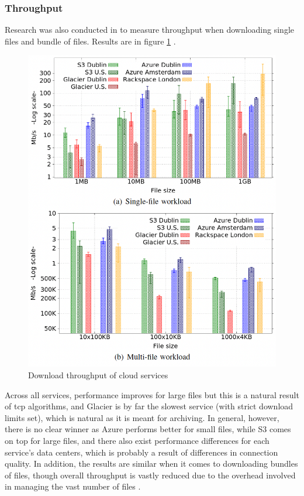 \subsubsection{Throughput}
Research was also conducted in \cite{s3vsblob_performance} to measure throughput when downloading single files and bundle of files. Results are in figure  \ref{fig:throughput} .
\begin{figure} [h]
    \centering
    \includegraphics[scale=0.5]{images/throughput}
    \caption{\label{fig:throughput}Download throughput of cloud services}
\end{figure}

Across all services, performance improves for large files but this is a natural result of \ac{tcp} algorithms, and Glacier is by far the slowest service (with strict download limits set), which is natural as it is meant for archiving. In general, however, there is no clear winner as Azure performs better for small files, while S3 comes on top for large files, and there also exist performance differences for each service's data centers, which is probably a result of differences in connection quality. In addition,  the results are similar when it comes to downloading bundles of files, though overall throughput is vastly reduced due to the overhead involved in managing the vast number of files .

